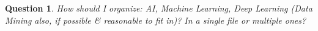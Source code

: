 \documentclass{article}
\numberwithin{equation}{section}
\newtheorem{question}{Question}[section]
\begin{document}
\begin{question}
	How should I organize: AI, Machine Learning, Deep Learning (Data Mining also, if possible \& reasonable to fit in)? In a single file or multiple ones?
\end{question}


\printbibliography[heading=bibintoc]
	
\end{document}
